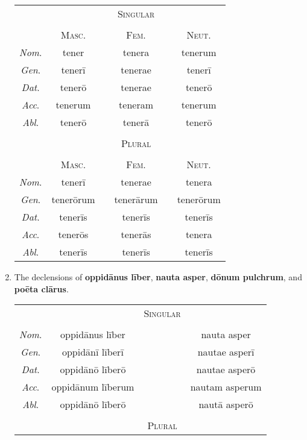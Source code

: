 \documentclass[12pt]{article}
\begin{document}
\begin{enumerate}[1.]
\begin{center}
		\begin{tabular}{ c c c c c c }
		& & & \textsc{Singular} & & \\
		& & & & & \\
		& \textsc{Masc}. & & \textsc{Fem}. & & \textsc{Neut}. \\
		\textit{Nom}. & tener & & tenera & & tenerum \\
		\textit{Gen}. & tenerī & & tenerae & & tenerī \\
		\textit{Dat}. & tenerō & & tenerae & & tenerō \\
		\textit{Acc}. & tenerum & & teneram & & tenerum \\
		\textit{Abl}. & tenerō & & tenerā & & tenerō \\
		& & & & & \\
		& & & \textsc{Plural} & & \\
		& & & & & \\
		& \textsc{Masc}. & & \textsc{Fem}. & & \textsc{Neut}. \\
		\textit{Nom}. & tenerī & & tenerae & & tenera \\
		\textit{Gen}. & tenerōrum & & tenerārum & & tenerōrum \\
		\textit{Dat}. & tenerīs & & tenerīs & & tenerīs \\
		\textit{Acc}. & tenerōs & & tenerās & & tenera \\
		\textit{Abl}. & tenerīs & & tenerīs & & tenerīs \\
		\end{tabular}
	\end{center}
	\item The declensions of \textbf{oppidānus līber}, \textbf{nauta asper}, \textbf{dōnum pulchrum}, and \textbf{poēta clārus}.
	\begin{center}
		\begin{tabular}{ c c c c }
		& & \textsc{Singular} & \\
		& & & \\
		\textit{Nom}. & oppidānus līber & & nauta asper \\
		\textit{Gen}. & oppidānī līberī & & nautae asperī \\
		\textit{Dat}. & oppidānō līberō & & nautae asperō \\
		\textit{Acc}. & oppidānum līberum & & nautam asperum \\
		\textit{Abl}. & oppidānō līberō & & nautā asperō \\
		& & & \\
		& & \textsc{Plural} & \\

\end{tabular}
\end{center}
\end{enumerate}
\end{document}
